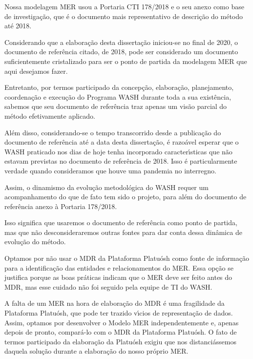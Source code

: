 \documentclass[
12pt,		%
openright,	%
twoside,  %
a4paper,			%
chapter=TITLE,		%
english,			%
french,				%
spanish,			%
brazil				%
]{USPSC-classe/USPSC}
\begin{document}
Nossa modelagem MER usou a Portaria CTI 178/2018 e o seu anexo como base de investiga\c{c}\~ao, que \'e o documento mais representativo de descri\c{c}\~ao do m\'etodo at\'e 2018.




Considerando que a elabora\c{c}\~ao desta disserta\c{c}\~ao iniciou-se no final de 2020, o documento de refer\^encia citado, de 2018, pode ser considerado um documento suficientemente cristalizado para ser o ponto de partida da modelagem MER que aqui desejamos fazer.




Entretanto, por termos participado da concep\c{c}\~ao, elabora\c{c}\~ao, planejamento, coordena\c{c}\~ao e execu\c{c}\~ao do Programa WASH durante toda a sua exist\^encia, sabemos que seu documento de refer\^encia traz apenas um vis\~ao parcial do m\'etodo efetivamente aplicado.




Al\'em disso, considerando-se o tempo transcorrido desde a publica\c{c}\~ao do documento de refer\^encia at\'e a data desta disserta\c{c}\~ao, \'e razo\'avel esperar que o WASH praticado nos dias de hoje tenha incorporado caracter\'{\i}sticas que n\~ao estavam previstas no documento de refer\^encia de 2018. Isso \'e particularmente verdade quando consideramos que houve uma pandemia no interregno.




Assim, o dinamismo da evolu\c{c}\~ao metodol\'ogica do WASH requer um acompanhamento do que de fato tem sido o projeto, para al\'em do documento de refer\^encia anexo \`a Portaria 178/2018.




Isso significa que usaremos o documento de refer\^encia como ponto de partida, mas que n\~ao desconsideraremos outras fontes para dar conta dessa din\^amica de evolu\c{c}\~ao do m\'etodo.




Optamos por n\~ao usar o MDR da Plataforma Platu\'osh como fonte de informa\c{c}\~ao para a identifica\c{c}\~ao das entidades e relacionamentos do MER. Essa op\c{c}\~ao se justifica porque as boas pr\'aticas indicam que o MER deve ser feito antes do MDR, mas esse cuidado n\~ao foi seguido pela equipe de TI do WASH.




A falta de um MER na hora de elabora\c{c}\~ao do MDR \'e uma fragilidade da Plataforma Platu\'osh, que pode ter trazido v\'{\i}cios de representa\c{c}\~ao de dados. Assim, optamos por desenvolver o Modelo MER independentemente e, apenas depois de pronto, compar\'a-lo com o MDR da Plataforma Platu\'osh. O fato de termos participado da elabora\c{c}\~ao da Platu\'osh exigiu que nos distanci\'assemos daquela solu\c{c}\~ao durante a elabora\c{c}\~ao do nosso pr\'oprio MER.
\end{document}
